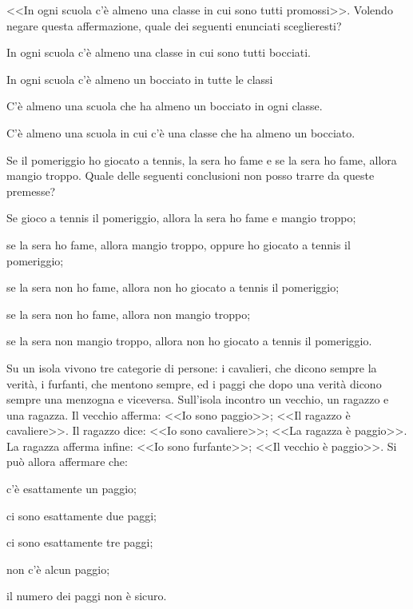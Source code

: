 \begin{esercizio}
\label{ese:6.23}
<<In ogni scuola c'è almeno una classe in cui sono tutti promossi>>. Volendo negare questa affermazione, quale dei seguenti
enunciati sceglieresti?
\begin{enumeratea}
\item In ogni scuola c'è almeno una classe in cui sono tutti bocciati.
\item In ogni scuola c'è almeno un bocciato in tutte le classi
\item C'è almeno una scuola che ha almeno un bocciato in ogni classe.
\item C'è almeno una scuola in cui c'è una classe che ha almeno un bocciato.
\end{enumeratea}
\end{esercizio}

\begin{esercizio}
\label{ese:6.24}
Se il pomeriggio ho giocato a tennis, la sera ho fame e se la sera ho fame, allora mangio troppo. Quale delle seguenti conclusioni non posso trarre da queste premesse?
\begin{enumeratea}
\item Se gioco a tennis il pomeriggio, allora la sera ho fame e mangio troppo;
\item se la sera ho fame, allora mangio troppo, oppure ho giocato a tennis il pomeriggio;
\item se la sera non ho fame, allora non ho giocato a tennis il pomeriggio;
\item se la sera non ho fame, allora non mangio troppo;
\item se la sera non mangio troppo, allora non ho giocato a tennis il pomeriggio.
\end{enumeratea}
\end{esercizio}

\begin{esercizio}
\label{ese:6.25}
Su un isola vivono tre categorie di persone: i cavalieri, che
dicono sempre la verità, i furfanti, che mentono sempre, ed i paggi che
dopo una verità dicono sempre una menzogna e viceversa.
Sull'isola incontro un vecchio, un ragazzo e una ragazza. Il vecchio afferma: <<Io sono paggio>>; <<Il ragazzo è
cavaliere>>. Il ragazzo dice: <<Io sono cavaliere>>; <<La ragazza è
paggio>>. La ragazza afferma infine: <<Io sono furfante>>; <<Il vecchio è
paggio>>. Si può allora affermare che:
\begin{enumeratea}
\begin{multicols}{2}
\item c'è esattamente un paggio;
\item ci sono esattamente due paggi;
\item ci sono esattamente tre paggi;
\item non c'è alcun paggio;
\item il numero dei paggi non è sicuro.
\end{multicols}
\end{enumeratea}
\end{esercizio}

